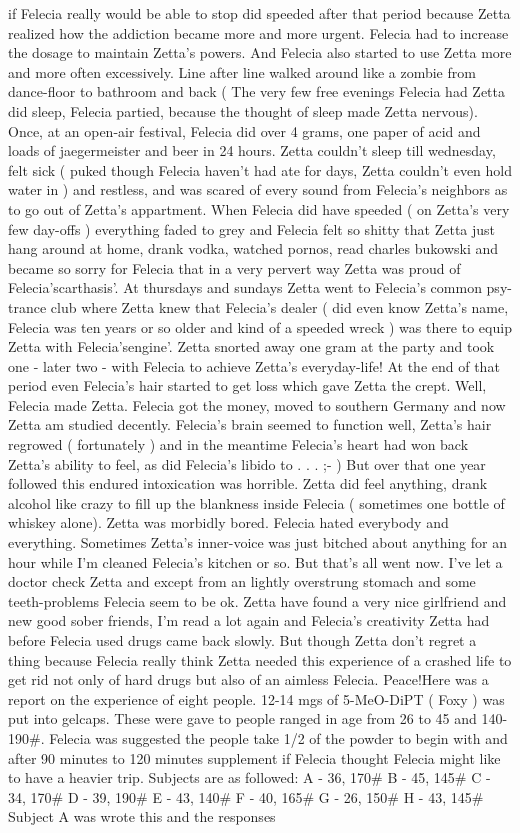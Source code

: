 \documentclass[12pt]{book}
\begin{document}
if Felecia really would be able to stop did speeded after that period because Zetta realized how the addiction became more and more urgent. Felecia had to increase the dosage to maintain Zetta's powers. And Felecia also started to use Zetta more and more often excessively. Line after line walked around like a zombie from dance-floor to bathroom and back ( The very few free evenings Felecia had Zetta did sleep, Felecia partied, because the thought of sleep made Zetta nervous). Once, at an open-air festival, Felecia did over 4 grams, one paper of acid and loads of jaegermeister and beer in 24 hours. Zetta couldn't sleep till wednesday, felt sick ( puked though Felecia haven't had ate for days, Zetta couldn't even hold water in ) and restless, and was scared of every sound from Felecia's neighbors as to go out of Zetta's appartment. When Felecia did have speeded ( on Zetta's very few day-offs ) everything faded to grey and Felecia felt so shitty that Zetta just hang around at home, drank vodka, watched pornos, read charles bukowski and became so sorry for Felecia that in a very pervert way Zetta was proud of Felecia'scarthasis'. At thursdays and sundays Zetta went to Felecia's common psy-trance club where Zetta knew that Felecia's dealer ( did even know Zetta's name, Felecia was ten years or so older and kind of a speeded wreck ) was there to equip Zetta with Felecia'sengine'. Zetta snorted away one gram at the party and took one - later two - with Felecia to achieve Zetta's everyday-life! At the end of that period even Felecia's hair started to get loss which gave Zetta the crept. Well, Felecia made Zetta. Felecia got the money, moved to southern Germany and now Zetta am studied decently. Felecia's brain seemed to function well, Zetta's hair regrowed ( fortunately ) and in the meantime Felecia's heart had won back Zetta's ability to feel, as did Felecia's libido to . . .  ;- ) But over that one year followed this endured intoxication was horrible. Zetta did feel anything, drank alcohol like crazy to fill up the blankness inside Felecia ( sometimes one bottle of whiskey alone). Zetta was morbidly bored. Felecia hated everybody and everything. Sometimes Zetta's inner-voice was just bitched about anything for an hour while I'm cleaned Felecia's kitchen or so. But that's all went now. I've let a doctor check Zetta and except from an lightly overstrung stomach and some teeth-problems Felecia seem to be ok. Zetta have found a very nice girlfriend and new good sober friends, I'm read a lot again and Felecia's creativity Zetta had before Felecia used drugs came back slowly. But though Zetta don't regret a thing because Felecia really think Zetta needed this experience of a crashed life to get rid not only of hard drugs but also of an aimless Felecia. Peace!Here was a report on the experience of eight people. 12-14 mgs of 5-MeO-DiPT ( Foxy ) was put into gelcaps. These were gave to people ranged in age from 26 to 45 and 140-190\#. Felecia was suggested the people take 1/2 of the powder to begin with and after 90 minutes to 120 minutes supplement if Felecia thought Felecia might like to have a heavier trip. Subjects are as followed: A - 36, 170\# B - 45, 145\# C - 34, 170\# D - 39, 190\# E - 43, 140\# F - 40, 165\# G - 26, 150\# H - 43, 145\# Subject A was wrote this and the responses 
\end{document}
